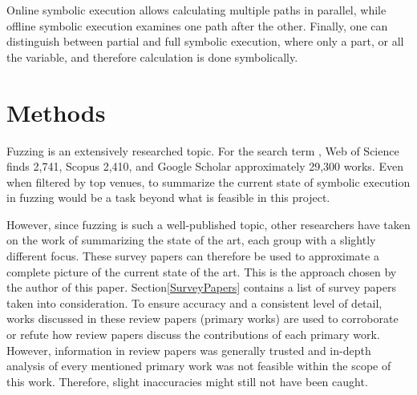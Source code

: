\documentclass{article}
\begin{document}
\begin{multicols}{2}
    Online symbolic execution allows calculating multiple paths in parallel, while offline symbolic execution examines one path after the other. Finally, one can distinguish between partial and full symbolic execution, where only a part, or all the variable, and therefore calculation is done symbolically.\cite{Ghidrion}

    \section{Methods}
    \label{Methods}
    Fuzzing is an extensively researched topic. For the search term , Web of Science\cite{WebOfScience} finds 2,741, Scopus\cite{Scopus} 2,410, and Google Scholar\cite{GoogleScholar} approximately 29,300 works. Even when filtered by top venues, to summarize the current state of symbolic execution in fuzzing would be a task beyond what is feasible in this project.

    However, since fuzzing is such a well-published topic, other researchers have taken on the work of summarizing the state of the art, each group with a slightly different focus. These survey papers can therefore be used to approximate a complete picture of the current state of the art. This is the approach chosen by the author of this paper. Section\ref{SurveyPapers} contains a list of survey papers taken into consideration. To ensure accuracy and a consistent level of detail, works discussed in these review papers (primary works) are used to corroborate or refute how review papers discuss the contributions of each primary work. However, information in review papers was generally trusted and in-depth analysis of every mentioned primary work was not feasible within the scope of this work. Therefore, slight inaccuracies might still not have been caught.


\end{multicols}
\end{document}
